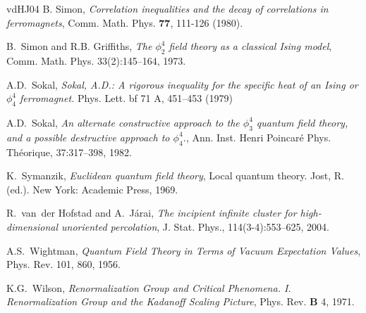 \documentclass[a4paper,oneside,11pt]{article}
\numberwithin{equation}{section}
\numberwithin{equation}{section}
\numberwithin{equation}{section}
\begin{document}
\begin{thebibliography}{vdHJ04}
 B. Simon, 
\emph{Correlation inequalities and the decay of correlations in ferromagnets}, 
  Comm. Math. Phys. {\bf 77}, 111-126 (1980). 

B.~Simon and R.B. Griffiths, \emph{The $\phi^4_2$ field theory as a classical
Ising model},   Comm. Math. Phys. 33(2):145--164, 1973.


A.D.~Sokal, \emph{
Sokal, A.D.: A rigorous inequality for the specific heat of an {I}sing or $\phi_4^4$ ferromagnet.}
Phys. Lett. {bf 71} A, 451--453 (1979)

A.D.~Sokal, \emph{An alternate constructive approach to the $\phi^4_3$ quantum
  field theory, and a possible destructive approach to $\phi_4^4$.}, Ann. Inst.
  Henri Poincar{\'e} Phys. Th{\'e}orique, 37:317--398, 1982.

K.~Symanzik, \emph{Euclidean quantum field theory}, Local quantum theory. Jost,
  R. (ed.). New York: Academic Press, 1969.

R.~van~der Hofstad and A.~J{\'a}rai, \emph{The incipient infinite cluster for
  high-dimensional unoriented percolation}, J. Stat. Phys., 114(3-4):553--625, 2004.

%  
A.S.~Wightman, \emph{ Quantum Field Theory in Terms of Vacuum Expectation Values},
Phys. Rev. 101, 860, 1956. 

 K.G.~Wilson, \emph{Renormalization Group and Critical Phenomena. I. Renormalization Group and the Kadanoff Scaling Picture}, 
Phys. Rev. {\bf B} 4, 1971.
\end{thebibliography}
\end{document}
